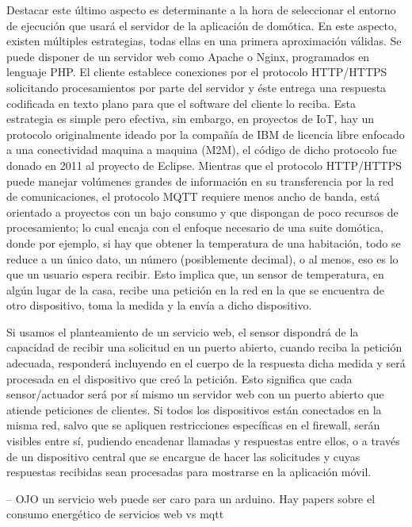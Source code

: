 Destacar este último aspecto es determinante a la hora de seleccionar el entorno de ejecución que usará el servidor de la aplicación de domótica. En este aspecto, existen múltiples estrategias, todas ellas en una primera aproximación válidas. Se puede disponer de un servidor web como Apache o Nginx, programados en lenguaje PHP. El cliente establece conexiones por el protocolo HTTP/HTTPS solicitando procesamientos por parte del servidor y éste entrega una respuesta codificada en texto plano para que el software del cliente lo reciba. Esta estrategia es simple pero efectiva, sin embargo, en proyectos de IoT, hay un protocolo originalmente ideado por la compañía de IBM de licencia libre enfocado a una conectividad maquina a maquina (M2M), el código de dicho protocolo fue donado en 2011 al proyecto de Eclipse. Mientras que el protocolo HTTP/HTTPS puede manejar volúmenes grandes de información en su transferencia por la red de comunicaciones, el protocolo MQTT requiere menos ancho de banda, está orientado a proyectos con un bajo consumo y que dispongan de poco recursos de procesamiento; lo cual encaja con el enfoque necesario de una suite domótica, donde por ejemplo, si hay que obtener la temperatura de una habitación, todo se reduce a un único dato, un número (posiblemente decimal), o al menos, eso es lo que un usuario espera recibir. Esto implica que, un sensor de temperatura, en algún lugar de la casa, recibe una petición en la red en la que se encuentra de otro dispositivo, toma la medida y la envía a dicho dispositivo.

\vspace{1.5cm}

Si usamos el planteamiento de un servicio web, el sensor dispondrá de la capacidad de recibir una solicitud en un puerto abierto, cuando reciba la petición adecuada, responderá incluyendo en el cuerpo de la respuesta dicha medida y será procesada en el dispositivo que creó la petición. Esto significa que cada sensor/actuador será por sí mismo un servidor web con un puerto abierto que atiende peticiones de clientes. Si todos los dispositivos están conectados en la misma red, salvo que se apliquen restricciones específicas en el firewall, serán visibles entre sí, pudiendo encadenar llamadas y respuestas entre ellos, o a través de un dispositivo central que se encargue de hacer las solicitudes y cuyas respuestas recibidas sean procesadas para mostrarse en la aplicación móvil.

 -- OJO
 un servicio web puede ser caro para un arduino. Hay papers sobre el consumo energético de servicios web vs mqtt

